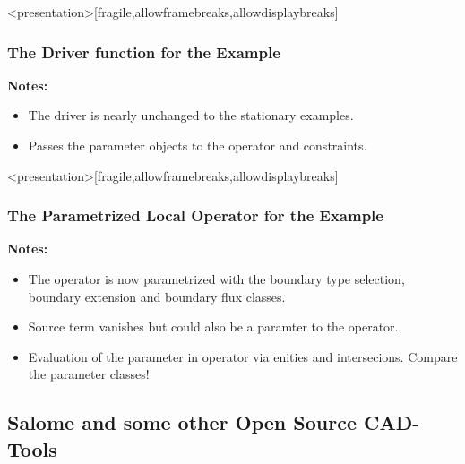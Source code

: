 \begin{frame}<presentation>[fragile,allowframebreaks,allowdisplaybreaks]
  \frametitle<presentation>{The Driver function for the Example}
  
  \textbf{Notes:}
  \begin{itemize}
    \item The driver is nearly unchanged to the stationary examples.
    \item Passes the parameter objects to the operator and constraints.
  \end{itemize}
\end{frame}

\begin{frame}<presentation>[fragile,allowframebreaks,allowdisplaybreaks]
  \frametitle<presentation>{The Parametrized Local Operator for the Example}
  
  \textbf{Notes:}
  \begin{itemize}
    \item The operator is now parametrized with the boundary type selection,
      boundary extension and boundary flux classes.
    \item Source term vanishes but could also be a paramter to the operator.
    \item Evaluation of the parameter in operator via enities and intersecions.
      Compare the parameter classes!
  \end{itemize}
\end{frame}

\subsection{Salome and some other Open Source CAD-Tools}

